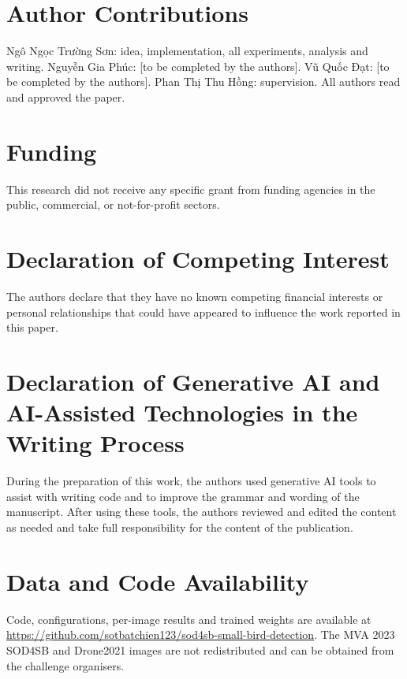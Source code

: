 \documentclass[conference]{IEEEtran}
\begin{document}
\section*{Author Contributions}
Ngô Ngọc Trường Sơn: idea, implementation, all experiments, analysis and writing. Nguyễn Gia Phúc: [to be completed
by the authors]. Vũ Quốc Đạt: [to be completed by the authors]. Phan Thị Thu Hồng: supervision. All authors read and
approved the paper.

\section*{Funding}
This research did not receive any specific grant from funding agencies in the public, commercial, or not-for-profit
sectors.

\section*{Declaration of Competing Interest}
The authors declare that they have no known competing financial interests or personal relationships that could have
appeared to influence the work reported in this paper.

\section*{Declaration of Generative AI and AI-Assisted Technologies in the Writing Process}
During the preparation of this work, the authors used generative AI tools to assist with writing code and to improve
the grammar and wording of the manuscript. After using these tools, the authors reviewed and edited the content as
needed and take full responsibility for the content of the publication.

\section*{Data and Code Availability}
Code, configurations, per-image results and trained weights are available at
\url{https://github.com/sotbatchien123/sod4sb-small-bird-detection}. The MVA 2023 SOD4SB and Drone2021 images are
not redistributed and can be obtained from the challenge organisers.



\end{document}
